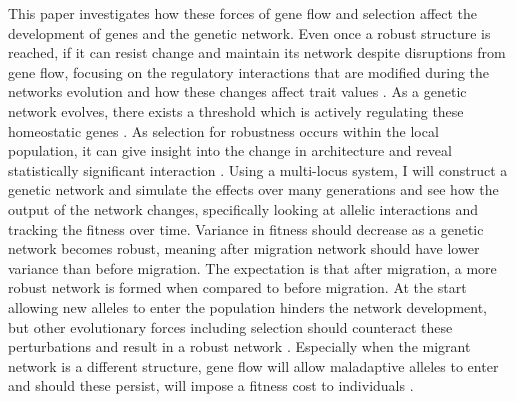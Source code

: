 This paper investigates how these forces of gene flow and selection affect the development of genes and the genetic network. Even once a robust structure is reached, if it can resist change and maintain its network despite disruptions from gene flow, focusing on the regulatory interactions that are modified during the networks evolution and how these changes affect trait values \cite{hinman2009evolution}. As a genetic network evolves, there exists a threshold which is actively regulating these homeostatic genes \cite{gjuvsland2007threshold}. As selection for robustness occurs within the local population, it can give insight into the change in architecture and reveal statistically significant interaction \cite{gjuvsland2007statistical}. Using a multi-locus system, I will construct a genetic network and simulate the effects over many generations and see how the output of the network changes, specifically looking at allelic interactions and tracking the fitness over time. Variance in fitness should decrease as a genetic network becomes robust, meaning after migration network should have lower variance than before migration. The expectation is that after migration, a more robust network is formed when compared to before migration. At the start allowing new alleles to enter the population hinders the network development, but other evolutionary forces including selection should counteract these perturbations and result in a robust network \cite{garcia1997genetic}. Especially when the migrant network is a different structure, gene flow will allow maladaptive alleles to enter and should these persist, will impose a fitness cost to individuals \cite{tigano2016genomics}.
